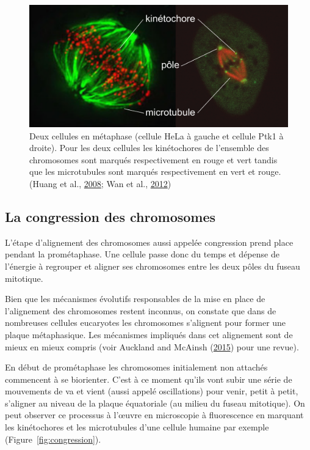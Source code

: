 \documentclass[12pt,a4paper,twoside,openright]{book}
\begin{document}
\begin{figure}[htbp]
\centering
\includegraphics{figures/intro/spindle_micro.png}
\caption[Deux types de cellules différentes en métaphase]{\label{fig:spindle_micro}Deux
cellules en métaphase (cellule HeLa à gauche et cellule Ptk1 à droite).
Pour les deux cellules les kinétochores de l'ensemble des chromosomes
sont marqués respectivement en rouge et vert tandis que les microtubules
sont marqués respectivement en vert et rouge. (Huang et al.,
\protect\hyperlink{ref-Huang2008}{2008}; Wan et al.,
\protect\hyperlink{ref-Wan2012}{2012})}
\end{figure}

\subsection{La congression des
chromosomes}\label{la-congression-des-chromosomes}

L'étape d'alignement des chromosomes aussi appelée congression prend
place pendant la prométaphase. Une cellule passe donc du temps et
dépense de l'énergie à regrouper et aligner ses chromosomes entre les
deux pôles du fuseau mitotique.

Bien que les mécanismes évolutifs responsables de la mise en place de
l'alignement des chromosomes restent inconnus, on constate que dans de
nombreuses cellules eucaryotes les chromosomes s'alignent pour former
une plaque métaphasique. Les mécanismes impliqués dans cet alignement
sont de mieux en mieux compris (voir Auckland and McAinsh
(\protect\hyperlink{ref-Auckland2015a}{2015}) pour une revue).

En début de prométaphase les chromosomes initialement non attachés
commencent à se biorienter. C'est à ce moment qu'ils vont subir une
série de mouvements de va et vient (aussi appelé oscillations) pour
venir, petit à petit, s'aligner au niveau de la plaque équatoriale (au
milieu du fuseau mitotique). On peut observer ce processus à l'œuvre en
microscopie à fluorescence en marquant les kinétochores et les
microtubules d'une cellule humaine par exemple
(Figure~\ref{fig:congression}).
\end{document}
